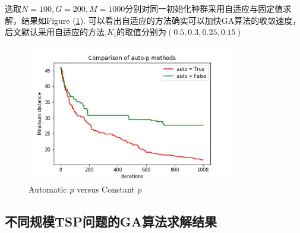 \documentclass[12pt]{article}
\begin{document}
选取$N=100,G=200,M=1000$分别对同一初始化种群采用自适应与固定值求解，结果如Figure (\ref{pic: GA auto test}).
可以看出自适应的方法确实可以加快GA算法的收敛速度，后文默认采用自适应的方法,$K_i$的取值分别为$(0.5, 0.3, 0.25, 0.15)$

\begin{figure}[H]
  \centering
  \includegraphics[height = 6cm]{../figure/GA_auto_test_100_200_1000_1.jpg}
  \caption{Automatic $p$ versus Constant $p$}
  \label{pic: GA auto test}
\end{figure}


\subsection{不同规模TSP问题的GA算法求解结果}
\end{document}
